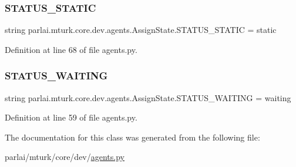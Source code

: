 \subsubsection{\texorpdfstring{S\+T\+A\+T\+U\+S\+\_\+\+S\+T\+A\+T\+IC}{STATUS\_STATIC}}
{\footnotesize\ttfamily string parlai.\+mturk.\+core.\+dev.\+agents.\+Assign\+State.\+S\+T\+A\+T\+U\+S\+\_\+\+S\+T\+A\+T\+IC = \textquotesingle{}static\textquotesingle{}\hspace{0.3cm}{\ttfamily [static]}}



Definition at line 68 of file agents.\+py.

\mbox{\label{classparlai_1_1mturk_1_1core_1_1dev_1_1agents_1_1AssignState_a16f109111265fa6c067aac1a32f47c3f}} 
\subsubsection{\texorpdfstring{S\+T\+A\+T\+U\+S\+\_\+\+W\+A\+I\+T\+I\+NG}{STATUS\_WAITING}}
{\footnotesize\ttfamily string parlai.\+mturk.\+core.\+dev.\+agents.\+Assign\+State.\+S\+T\+A\+T\+U\+S\+\_\+\+W\+A\+I\+T\+I\+NG = \textquotesingle{}waiting\textquotesingle{}\hspace{0.3cm}{\ttfamily [static]}}



Definition at line 59 of file agents.\+py.



The documentation for this class was generated from the following file\+:\begin{DoxyCompactItemize}
\item 
parlai/mturk/core/dev/\hyperlink{parlai_2mturk_2core_2dev_2agents_8py}{agents.\+py}\end{DoxyCompactItemize}
